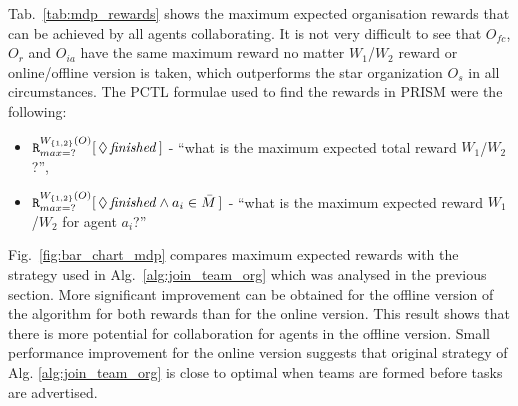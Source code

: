 \documentclass{llncs}
\begin{document}
Tab.~\ref{tab:mdp_rewards} shows the maximum expected organisation rewards that can be achieved by all agents collaborating. It is not very difficult to see that $O_{fc}$, $O_r$ and $O_{ia}$ have the same maximum reward no matter $W_1$/$W_2$ reward or online/offline version is taken, which outperforms the star organization $O_s$ in all circumstances. The PCTL formulae used to find the rewards in PRISM were the following:
\begin{itemize}
 \item ${\tt R}_{max=?}^{W_{\{1,2\}}(O)}[\,\Diamond\,\mathit{finished}\,]$ -
``what is the maximum expected total reward $W_1$/$W_2$?'',
 \item ${\tt R}_{max=?}^{W_{\{1,2\}}(O)}[\,\Diamond\,\mathit{finished} \wedge a_i \in \bar{M} \,]$ -
``what is the maximum expected reward $W_1$/$W_2$ for agent $a_i$?''
\end{itemize}


Fig.~\ref{fig:bar_chart_mdp} compares maximum expected rewards with the strategy used in Alg.~\ref{alg:join_team_org} which was analysed  in the previous section. More significant improvement can be obtained for the offline version of the algorithm for both rewards than for the online version. This result shows that there is more potential for collaboration for agents in the offline version. Small performance improvement for the online version suggests that original strategy of Alg. \ref{alg:join_team_org} is close to optimal when teams are formed before tasks are advertised.
\end{document}
